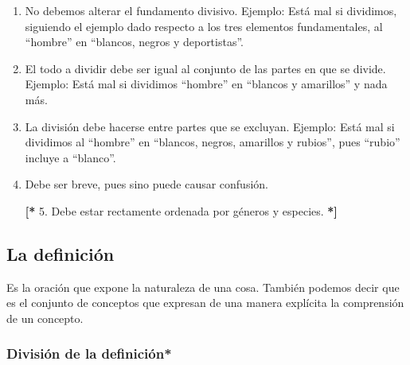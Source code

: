 \documentclass{article}
\begin{document}
\begin{enumerate}
    \item No debemos alterar el fundamento divisivo. Ejemplo: Está mal si dividimos, siguiendo el ejemplo dado respecto a los tres elementos fundamentales, al ``hombre'' en ``blancos, negros y deportistas''.
    \item El todo a dividir debe ser igual al conjunto de las partes en que se divide. Ejemplo: Está mal si dividimos ``hombre'' en ``blancos y amarillos'' y nada más.
    \item La división debe hacerse entre partes que se excluyan. Ejemplo: Está mal si dividimos al ``hombre'' en ``blancos, negros, amarillos y rubios'', pues ``rubio'' incluye a ``blanco''.
    \item Debe ser breve, pues sino puede causar confusión.
    \item[\textbf{[*} 5.] Debe estar rectamente ordenada por géneros y especies. \textbf{*]}
\end{enumerate}
    
\subsection{La definición}
    Es la oración que expone la naturaleza de una cosa. También podemos decir que es el conjunto de conceptos que expresan de una manera explícita la comprensión de un concepto. \par
    
\subsubsection{División de la definición*}
    
\end{document}
